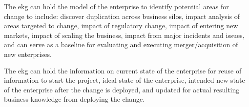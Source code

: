The \gls{ekg} can hold the model of the enterprise to identify potential areas for change to include:
discover duplication across business silos, impact analysis of areas targeted to change,
impact of regulatory change, impact of entering new markets, impact of scaling the business,
impact from major incidents and issues, and can serve as a baseline for evaluating and executing
merger/acquisition of new enterprises.

The \gls{ekg} can hold the information  on current state of the enterprise for reuse of information to start the
project, ideal state of the enterprise, intended new state of the enterprise after the change is deployed,
and updated for actual resulting business knowledge from deploying the change.
